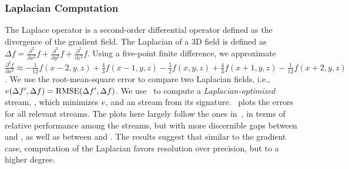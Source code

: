 \subsubsection{Laplacian Computation}\label{sec:laplacian}

The Laplace operator is a second-order differential operator defined as the divergence of the
gradient field. The Laplacian of a 3D field is defined as $\Delta f = 
\frac{{\partial}^2}{\partial{x^2}}f+\frac{{\partial}^2}{\partial{y^2}}f+\frac{{\partial}^2}{\partial{z^2}}f$.
%
Using a five-point finite difference, we approximate 
$\frac{{\partial}^2 f}{\partial{x^2}}
\approx
-\frac{1}{12}f(x-2,y,z)+\frac{4}{3}f(x-1,y,z)-\frac{5}{2}f(x,y,z)+\frac{4}{3}f(x+1,y,z)-\frac{1}{12}f(x+2,y,z)$.
We use the root-mean-square error to compare two Laplacian fields, i.e., $e(\Delta f',\Delta
f)=\text{RMSE}(\Delta f',\Delta f)$. We use~ to compute a
\emph{Laplacian-optimized} stream, \slop, which minimizes $e$, and an \slsg stream from its
signature.~ plots the errors for all relevant streams. The
plots here largely follow the ones in~, in terms of relative
performance among the streams, but with more discernible gaps between \sbit and \slsg, as well as
between \slsg and \sbit. The results suggest that similar to the gradient case, computation of the
Laplacian favors resolution over precision, but to a higher degree.